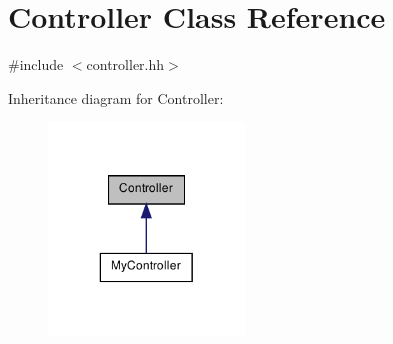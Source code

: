 \hypertarget{class_controller}{
\section{Controller Class Reference}
\label{class_controller}
}


{\ttfamily \#include $<$controller.hh$>$}



Inheritance diagram for Controller:\nopagebreak
\begin{figure}[H]
\begin{center}
\leavevmode
\includegraphics[width=148pt]{class_controller__inherit__graph}
\end{center}
\end{figure}
